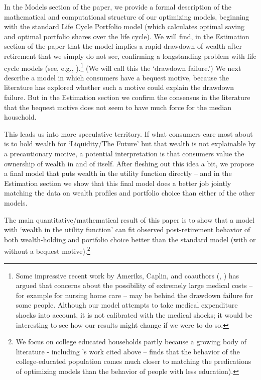 \documentclass{article}
\begin{document}
In the Models section of the paper, we provide a formal description of the mathematical and computational structure of our optimizing models, beginning with the standard Life Cycle Portfolio model (which calculates optimal saving and optimal portfolio shares over the life cycle).  We will find, in the Estimation section of the paper that the model implies a rapid drawdown of wealth after retirement that we simply do not see, confirming a longstanding problem with life cycle models (see, e.g., \cite{hurd1987savings}).\footnote{Some impressive recent work by Ameriks, Caplin, and coauthors (\cite{ameriks2011joy}, \cite{Ameriks2020jpe}) has argued that concerns about the possibility of extremely large medical costs -- for example for nursing home care -- may be behind the drawdown failure for some people. Although our model attempts to take medical expenditure shocks into account, it is not calibrated with the \cite{Ameriks2020jpe} medical shocks; it would be interesting to see how our results might change if we were to do so.}  (We will call this the `drawdown failure.') We next describe a model in which consumers have a bequest motive, because the literature has explored whether such a motive could explain the drawdown failure.  But in the Estimation section we confirm the consensus in the literature that the bequest motive does not seem to have much force for the median household.

This leads us into more speculative territory.  If what consumers care most about is to hold wealth for `Liquidity/The Future' but that wealth is not explainable by a precautionary motive, a potential interpretation is that consumers value the ownership of wealth in and of itself.  After fleshing out this idea a bit, we propose a final model that puts wealth in the utility function directly -- and in the Estimation section we show that this final model does a better job jointly matching the data on wealth profiles and portfolio choice than either of the other models.

The main quantitative/mathematical result of this paper is to show that a model with `wealth in the utility function' can fit observed post-retirement behavior of both wealth-holding and portfolio choice better than the standard model (with or without a bequest motive).\footnote{We focus on college educated households partly because a growing body of literature - including \cite{velasquezgiraldoJMP}'s work cited above -- finds that the behavior of the college-educated population comes much closer to matching the predications of optimizing models than the behavior of people with less education).}
\end{document}
